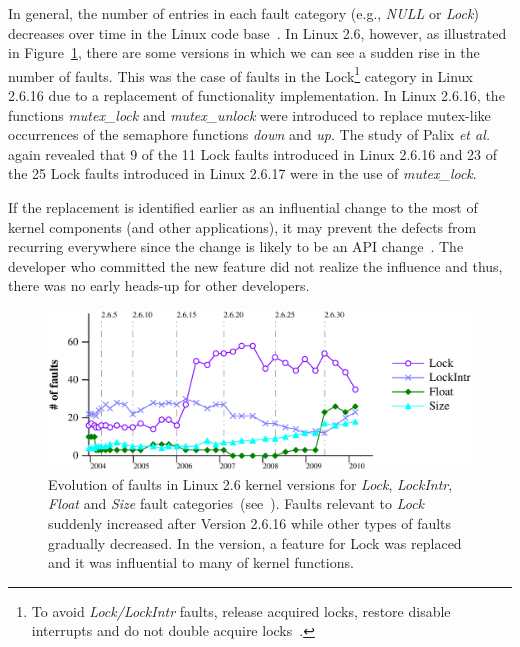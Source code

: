 In general, the number of entries in each fault category (e.g., {\it NULL} or {\it Lock})
decreases over
time in the Linux code base~\cite{Palix10Faults}.
In Linux 2.6, however, as illustrated in Figure~\ref{fig:lock_rise}, there are
some versions in which we can see a sudden rise in the number of faults.
This was the case of faults in the Lock\footnote{To avoid {\it Lock/LockIntr}
faults, release acquired locks, restore disable interrupts and do not double
acquire locks~\cite{Palix10Faults,Diagnosys}.
} 
category in Linux 2.6.16 due to a replacement of
functionality implementation.
In Linux 2.6.16, the functions {\it mutex\_lock} and {\it mutex\_unlock} were
introduced to replace mutex-like occurrences of the semaphore functions {\it
down} and {\it up}. The study of Palix {\it et al.} again revealed that 9 of the
11 Lock faults introduced in Linux  2.6.16 and 23 of the 25 Lock faults
introduced in Linux 2.6.17 were in the use of {\it mutex\_lock}.

If the replacement is identified earlier as an influential change to the most of
kernel components (and other applications), it may prevent the defects from
recurring everywhere since the change is likely to be an API
change~\cite{linares-vasquez_api_2013,dig_how_2006}.
The developer who committed the new feature did not realize the influence and thus,
there was no early heads-up for other developers.


\begin{figure}[h!]%
\includegraphics[width=\linewidth]{fig/feature-replacement} \caption{Evolution
of faults in Linux 2.6 kernel versions for {\it Lock}, {\it LockIntr}, {\it
Float} and {\it Size} fault categories~(see~\cite{Palix10Faults}). Faults
relevant to \emph{Lock} suddenly increased after Version 2.6.16 while other
types of faults gradually decreased. In the version, a feature for Lock was
replaced and it was influential to many of kernel functions.}
\label{fig:lock_rise}
\end{figure}


